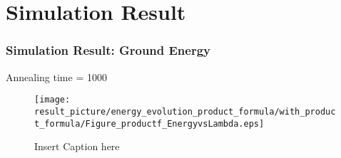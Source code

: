 \documentclass{beamer}
\begin{document}
\section{Simulation Result}
%			
%
%
%		
%

%		
%

\begin{frame}
	\frametitle{Simulation Result: Ground Energy}
	Annealing time = 1000
	\begin{figure}
		\centering
		\texttt{[image: result\_picture/energy\_evolution\_product\_formula/with\_product\_formula/Figure\_productf\_EnergyvsLambda.eps]}
		\caption{Insert Caption here}
	\end{figure}
\end{frame}
\end{document}

